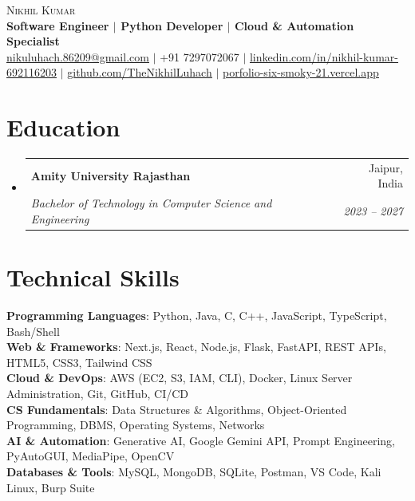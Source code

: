 \documentclass[letterpaper,10pt]{article}
\makeatletter
\newcommand{\resumeSubheading}[4]{
  \vspace{-2pt}\item
    \begin{tabular*}{0.98\textwidth}[t]{l@{\extracolsep{\fill}}r}
      \textbf{#1} & #2 \\
      \textit{\small#3} & \textit{\small #4} \\
    \end{tabular*}\vspace{-5pt}
}
\newcommand{\resumeSubHeadingListStart}{\begin{itemize}[leftmargin=0.15in, label={}]}
\newcommand{\resumeSubHeadingListEnd}{\end{itemize}}
\makeatother
\begin{document}
\begin{center}
    {\Huge \scshape Nikhil Kumar} \\ \vspace{2pt}
    \textbf{Software Engineer $|$ Python Developer $|$ Cloud \& Automation Specialist} \\ \vspace{4pt}
    \small 
    \href{mailto:nikuluhach.86209@gmail.com}{\underline{nikuluhach.86209@gmail.com}} $|$ 
    +91 7297072067 $|$ 
    \href{https://www.linkedin.com/in/nikhil-kumar-692116203}{\underline{linkedin.com/in/nikhil-kumar-692116203}} $|$ 
    \href{https://github.com/TheNikhilLuhach}{\underline{github.com/TheNikhilLuhach}} $|$ 
    \href{https://porfolio-six-smoky-21.vercel.app/}{\underline{porfolio-six-smoky-21.vercel.app}}
\end{center}

\section{Education}
  \resumeSubHeadingListStart
    \resumeSubheading
      {Amity University Rajasthan}{Jaipur, India}
      {Bachelor of Technology in Computer Science and Engineering}{2023 -- 2027}
  \resumeSubHeadingListEnd

\section{Technical Skills}
 \begin{itemize}[leftmargin=0.15in, label={}]
    \small{\item{
     \textbf{Programming Languages}{: Python, Java, C, C++, JavaScript, TypeScript, Bash/Shell} \\
     \textbf{Web \& Frameworks}{: Next.js, React, Node.js, Flask, FastAPI, REST APIs, HTML5, CSS3, Tailwind CSS} \\
     \textbf{Cloud \& DevOps}{: AWS (EC2, S3, IAM, CLI), Docker, Linux Server Administration, Git, GitHub, CI/CD} \\
     \textbf{CS Fundamentals}{: Data Structures \& Algorithms, Object-Oriented Programming, DBMS, Operating Systems, Networks} \\
     \textbf{AI \& Automation}{: Generative AI, Google Gemini API, Prompt Engineering, PyAutoGUI, MediaPipe, OpenCV} \\
     \textbf{Databases \& Tools}{: MySQL, MongoDB, SQLite, Postman, VS Code, Kali Linux, Burp Suite}
    }}
 \end{itemize}
\end{document}
